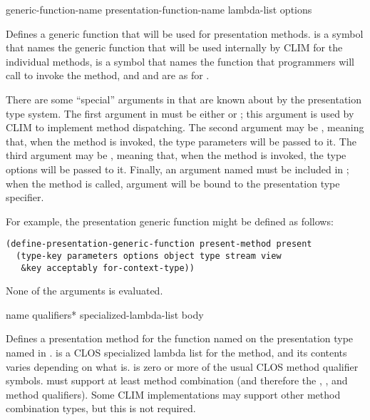  {generic-function-name 
                                                  presentation-function-name
                                                  lambda-list \rest options}

Defines a generic function that will be used for presentation methods.
 is a symbol that names the generic function that
will be used internally by CLIM for the individual methods,
 is a symbol that names the function that
programmers will call to invoke the method, and  and
 are as for .

There are some ``special'' arguments in  that are known about
by the presentation type system.  The first argument in  must
be either  or ; this argument is used by CLIM to
implement method dispatching.  The second argument may be ,
meaning that, when the method is invoked, the type parameters will be passed to
it.  The third argument may be , meaning that, when the method is
invoked, the type options will be passed to it.  Finally, an argument named
 must be included in ; when the method is called,
 argument will be bound to the presentation type specifier.

For example, the  presentation generic function might be defined as
follows:
\begin{verbatim}
(define-presentation-generic-function present-method present
  (type-key parameters options object type stream view
   &key acceptably for-context-type))
\end{verbatim}

None of the arguments is evaluated.


 {name qualifiers* specialized-lambda-list \body body}

Defines a presentation method for the function named  on the
presentation type named in .
 is a CLOS specialized lambda list for the method,
and its contents varies depending on what  is.   is
zero or more of the usual CLOS method qualifier symbols.
 must support at least  method
combination (and therefore the , , and 
method qualifiers).  Some CLIM implementations may support other method
combination types, but this is not required.

